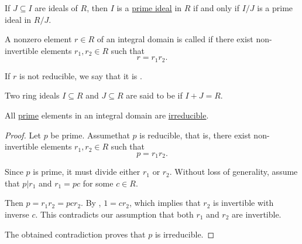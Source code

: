 \begin{proposition}\label{thm:prime_ideal_iff_prime_quotient_ideal}
  If \( J \subseteq I \) are ideals of \( R \), then \( I \) is a \hyperref[def:prime_ring_ideal]{prime ideal} in \( R \) if and only if \( I / J \) is a prime ideal in  \( R / J \).
\end{proposition}

\begin{definition}\label{def:irreducible_ring_element}
  A nonzero element \( r \in R \) of an integral domain is called  if there exist non-invertible elements \( r_1, r_2 \in R \) such that
  \begin{equation*}
    r = r_1 r_2.
  \end{equation*}

  If \( r \) is not reducible, we say that it is .
\end{definition}

\begin{definition}\label{def:coprime_ring_ideals}
  Two ring ideals \( I \subseteq R \) and \( J \subseteq R \) are said to be  if \( I + J = R \).
\end{definition}

\begin{proposition}\label{thm:prime_implies_irreducible}
  All \hyperref[def:prime_ring_ideal]{prime} elements in an integral domain are \hyperref[def:irreducible_ring_element]{irreducible}.
\end{proposition}
\begin{proof}
  Let \( p \) be prime. Assume\LEM that \( p \) is reducible, that is, there exist non-invertible elements \( r_1, r_2 \in R \) such that
  \begin{equation*}
    p = r_1 r_2.
  \end{equation*}

  Since \( p \) is prime, it must divide either \( r_1 \) or \( r_2 \). Without loss of generality, assume that \( p | r_1 \) and \( r_1 = pc \) for some \( c \in R \).

  Then \( p = r_1 r_2 = pc r_2 \). By , \( 1 = c r_2 \), which implies that \( r_2 \) is invertible with inverse \( c \). This contradicts our assumption that both \( r_1 \) and \( r_2 \) are invertible.

  The obtained contradiction proves that \( p \) is irreducible.
\end{proof}

